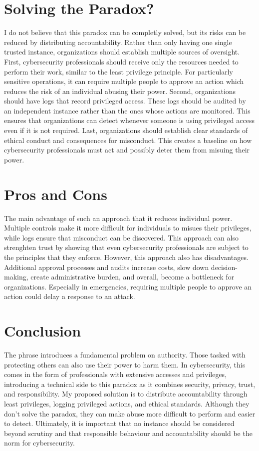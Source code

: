 \documentclass[12pt]{article}
\begin{document}
\section{Solving the Paradox?}
I do not believe that this paradox can be completly solved, but its risks can be reduced by distributing accountability. Rather than only having one single trusted instance, organizations should establish multiple sources of oversight.
\newline
First, cybersecurity professionals should receive only the resources needed to perform their work, similar to the least privilege principle. For particularly sensitive operations, it can require multiple people to approve an action which reduces the risk of an individual abusing their power.
\newline
Second, organizations should have logs that record privileged access. These logs should be audited by an independent instance rather than the ones whose actions are monitored. This ensures that organizations can detect whenever someone is using privileged access even if it is not required.
\newline
Last, organizations should establish clear standards of ethical conduct and consequences for misconduct. This creates a baseline on how cybersecurity professionals must act and possibly deter them from misuing their power.

\section{Pros and Cons}
The main advantage of such an approach that it reduces individual power. Multiple controls make it more difficult for individuals to misues their privileges, while logs ensure that misconduct can be discovered. This approach can also strenghten trust by showing that even cybersecurity professionals are subject to the principles that they enforce.
\newline
However, this approach also has disadvantages. Additional approval processes and audits increase costs, slow down decision-making, create administrative burden, and overall, become a bottleneck for organizations. Especially in emergencies, requiring multiple people to approve an action could delay a response to an attack.

\section{Conclusion}
The phrase introduces a fundamental problem on authority. Those tasked with protecting others can also use their power to harm them. In cybersecurity, this comes in the form of professionals with extensive accesses and privileges, introducing a technical side to this paradox as it combines security, privacy, trust, and responsibility.
\newline
My proposed solution is to distribute accountability through least privileges, logging privileged actions, and ethical standards. Although they don't solve the paradox, they can make abuse more difficult to perform and easier to detect. 
\newline
Ultimately, it is important that no instance should be considered beyond scrutiny and that responsible behaviour and accountability should be the norm for cybersecurity.
\end{document}
